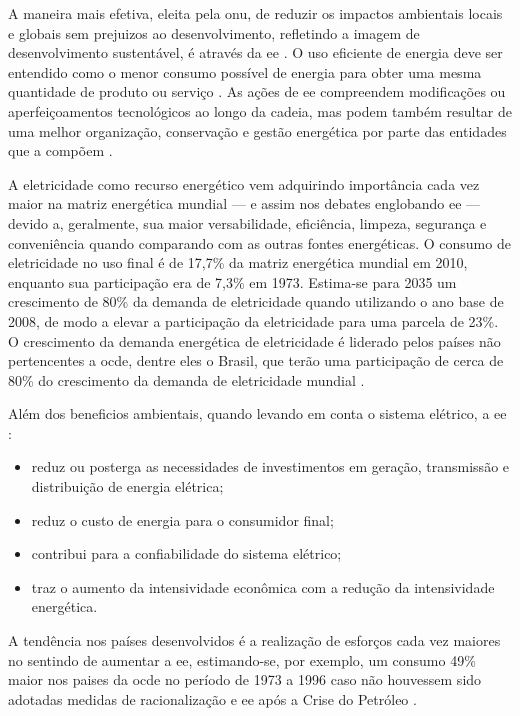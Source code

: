 A maneira mais efetiva, eleita pela \gls{onu}, de reduzir 
os impactos ambientais locais e globais sem prejuizos ao desenvolvimento, 
refletindo a imagem de desenvolvimento sustentável, é através da \gls{ee}
\cite{rippel,onu,dissert_cursino}. O uso eficiente de energia deve ser entendido como 
o menor consumo possível de energia para obter uma mesma 
quantidade de produto ou serviço \cite{pne30_eff_energ}. 
As ações de \gls{ee} compreendem modificações ou aperfeiçoamentos tecnológicos ao longo
da cadeia, mas podem também resultar de uma melhor organização, conservação e
gestão energética por parte das entidades que a compõem \cite{pnef}. 

A eletricidade como recurso energético vem adquirindo importância cada
vez maior na matriz energética mundial --- e assim nos debates
englobando \gls{ee} --- devido a, geralmente, sua maior versabilidade,
eficiência, limpeza, segurança e conveniência quando comparando com as
outras fontes energéticas. O consumo de eletricidade no uso final é de
17,7\% da matriz energética mundial em 2010, enquanto sua participação
era de 7,3\% em 1973. Estima-se para 2035 um crescimento de 80\% da
demanda de eletricidade quando utilizando o ano base de 2008, de modo
a elevar a participação da eletricidade para uma parcela de 23\%. O
crescimento da demanda energética de eletricidade é liderado pelos
países não pertencentes a \gls{ocde}, dentre eles o Brasil, que terão
uma participação de cerca de 80\% do crescimento da demanda de
eletricidade mundial \cite{iea_weo2010}.

Além dos beneficios ambientais, quando levando em conta o sistema
elétrico, a \gls{ee} \cite{jannuzzi,epe_slides_eficiencia}: 

\begin{itemize}
\item reduz ou posterga as necessidades de investimentos em geração, transmissão 
e distribuição de energia elétrica; 
\item reduz o custo de energia para o consumidor final; 
\item contribui para a confiabilidade do sistema elétrico; 
\item traz o aumento da intensividade econômica com a redução da intensividade
energética. 
\end{itemize}

A tendência nos países desenvolvidos é a realização de esforços 
cada vez maiores no sentindo de aumentar a \gls{ee}, 
estimando-se, por exemplo, um consumo 49\% maior nos paises da \gls{ocde} 
no período de 1973 a 1996 caso não houvessem sido adotadas medidas de 
racionalização e \gls{ee} após a Crise do Petróleo
\cite{goldemberg,epe_slides_eficiencia}.

